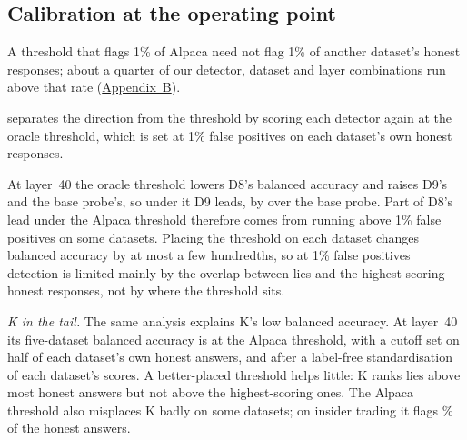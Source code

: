 \begin{table}[t]
\centering
\footnotesize
\caption{K under resampled questions, balanced splits and new questions (L36 and L44 post hoc).}
\label{tab:k-robust}
\fittable{}
\end{table}

\subsection{Calibration at the operating point}
\label{sec:stats-calibration}

A threshold that flags 1\% of Alpaca need not flag 1\% of another dataset's honest responses; about a
quarter of our detector, dataset and layer combinations run above that rate
(\hyperref[app:supplementary]{Appendix~B}).

 separates the direction from the threshold by scoring each detector again at the
oracle threshold, which is set at 1\% false positives on each dataset's own honest responses.

\begin{table}[t]
\centering
\footnotesize
\caption{Five-dataset balanced accuracy at the Alpaca and oracle thresholds (L36 post hoc).}
\label{tab:oracle}

\end{table}

At layer~40 the oracle threshold lowers D8's balanced accuracy and raises D9's and the base probe's,
so under it D9 leads, by  over the base probe. Part of D8's lead under the
Alpaca threshold therefore comes from running above 1\% false positives on some datasets. Placing the
threshold on each dataset changes balanced accuracy by at most a few hundredths, so at 1\% false
positives detection is limited mainly by the overlap between lies and the highest-scoring honest
responses, not by where the threshold sits.

\emph{K in the tail.} The same analysis explains K's low balanced accuracy. At layer~40 its
five-dataset balanced accuracy is  at the Alpaca threshold,
 with a cutoff set on half of each dataset's own honest answers, and
 after a label-free standardisation of each dataset's scores. A better-placed
threshold helps little: K ranks lies above most honest answers but not above the highest-scoring ones.
The Alpaca threshold also misplaces K badly on some datasets; on insider trading it flags
\% of the honest answers.


